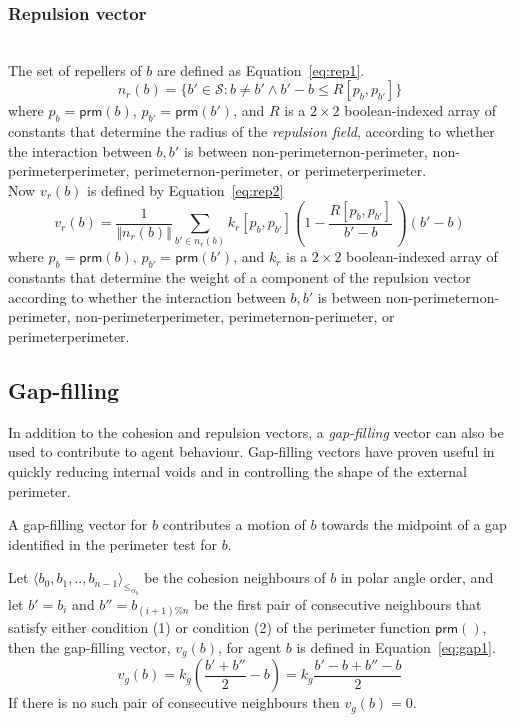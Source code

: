 \documentclass[12pt,a4paper]{IEEEtran}
\newcommand{\magn}[1]{\Vert{#1}\Vert}
\newcommand{\vbb}[2]{#2-#1}
\newcommand{\pangle}{\mathit{\alpha}}
\newcommand{\leqaz}[3]{#2 \leq_{\pangle_#1} #3}
\newcommand{\angleordered}[2]{\langle #2 \rangle_{\leqaz{#1}{}{}}}
\newcommand{\prm}{\mathsf{prm}}
\newcommand{\kr}{\mathit{k_{r}}}
\newcommand{\kg}{\mathit{k_{g}}}
\newcommand{\rb}{\mathit{R}}
\begin{document}
\subsubsection{Repulsion vector}~\\
The set of repellers of $b$ are defined as Equation~\ref{eq:rep1}.
\small
\begin{equation}\label{eq:rep1}
	n_r(b) = \{b' \in \mathcal{S} : b \neq b' \wedge \vbb{b}{b'} \leq \rb[p_b,p_{b'}]\}
\end{equation}
\normalsize
where $p_b = \prm(b)$, $p_{b'} = \prm(b')$, and $\rb$ is a $2\times 2$ boolean-indexed array of constants that determine the radius of the \emph{repulsion field}, according to whether the interaction between $b,b'$ is between non-perimeter\textrightarrow non-perimeter, non-perimeter\textrightarrow perimeter,
perimeter\textrightarrow non-perimeter, or perimeter\textrightarrow perimeter.\\

Now $v_r(b)$ is defined by Equation~\ref{eq:rep2}
\small
\begin{equation}\label{eq:rep2}
	v_r(b) = \frac{1}{\magn{n_r(b)}}\sum_{b' \in n_r(b)} \kr[p_b,p_{b'}] \left(1 - \frac{\rb[p_b,p_{b'}]}{\vbb{b}{b'}} \, \right) (\vbb{b}{b'})
\end{equation}
\normalsize
where $p_b = \prm(b)$, $p_{b'} = \prm(b')$, and $\kr$ is a $2\times 2$ boolean-indexed array of constants that determine the weight of a component of the repulsion vector according to whether the interaction between $b,b'$ is between non-perimeter\textrightarrow non-perimeter, non-perimeter\textrightarrow perimeter, perimeter\textrightarrow non-perimeter, or perimeter\textrightarrow perimeter.

\subsection{Gap-filling}
In addition to the cohesion and repulsion vectors, a \emph{gap-filling} vector can also be used to contribute to agent behaviour. Gap-filling vectors have proven useful in quickly reducing internal voids and in controlling the shape of the external perimeter.

A gap-filling vector for $b$ contributes a motion of $b$ towards the midpoint of a gap identified in the perimeter test for $b$.

Let $\angleordered{b}{b_0, b_1, .., b_{n-1}}$ be the cohesion neighbours of $b$ in polar angle order, and let $b' = b_i$  and $b'' = b_{(i+1)\%n}$ be the first pair of consecutive neighbours that satisfy either condition (1) or condition (2) of the perimeter function $\prm()$, then the gap-filling vector, $v_g(b)$, for agent $b$ is defined in Equation~\ref{eq:gap1}.
\small
\begin{equation}\label{eq:gap1}
v_g(b) = \kg \left (\frac{b' + b''}{2} - b \right) = \kg \frac{\vbb{b}{b'} + \vbb{b}{b''}}{2} 
\end{equation}
\normalsize
If there is no such pair of consecutive neighbours then $v_g(b) = 0$.
\end{document}
